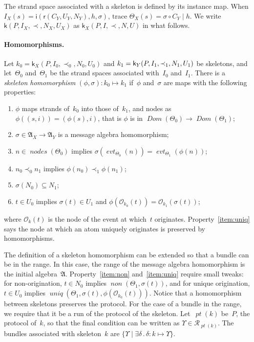 \documentclass[titlepage,12pt]{article}
\newcommand{\fn}[1]{\ensuremath{\operatorname{\mathit{#1}}}}
\newcommand{\typ}{\mathbin:}
\newcommand{\sdom}{\fn{Dom}}
\newcommand{\some}[1]{\exists#1\mathpunct.}
\newcommand{\prefix}[2]{#1\mid#2}
\newcommand{\run}{\mathcal{R}}
\newcommand{\pt}{\fn{pt}}
\newcommand{\alg}[1]{\ensuremath{\mathfrak#1}}
\newcommand{\skel}{\mathsf{k}}
\newcommand{\insta}{\mathsf{i}}
\newcommand{\evt}{\fn{evt}}
\newcommand{\role}{\mathsf{r}}
\newcommand{\orig}{\mathcal{O}}
\begin{document}
The strand space associated with a skeleton is defined by its instance
map.  When $I_X(s)=\insta(\role(C_Y,U_Y,N_Y),h,\sigma)$, trace
$\Theta_X(s)=\sigma\circ\prefix{C_Y}{h}$.  We write
$\skel(P,I_X,\prec,N_X,U_X)$ as $\skel_X(P,I,\prec,N,U)$ in what
follows.

\paragraph{Homomorphisms.}
Let $k_0=\skel_X(P,I_0,\prec_0,N_0,U_0)$ and
$k_1=\skel_Y(P,I_1,\prec_1,\break N_1,U_1)$ be skeletons, and
let~$\Theta_0$ and~$\Theta_1$ be the strand spaces associated
with~$I_0$ and~$I_1$.  There is a \emph{skeleton
  homomorphism} $(\phi,\sigma)\typ k_0\mapsto k_1$ if~$\phi$
and~$\sigma$ are maps with the following properties:
\begin{enumerate}
\item\label{item:strand} $\phi$ maps strands of~$k_0$ into those
  of~$k_1$, and nodes as $\phi((s,i))=(\phi(s),i)$, that is $\phi$ is
  in $\sdom(\Theta_0)\to\sdom(\Theta_1)$;
\item\label{item:msg} $\sigma\in\alg{A}_X\to\alg{A}_Y$ is a message
  algebra homomorphism;
\item\label{item:node} $n\in\fn{nodes}(\Theta_0)$ implies
  $\sigma(\evt_{\Theta_0}(n))=\evt_{\Theta_1}(\phi(n))$;
\item\label{item:order} $n_0\prec_0
n_1$ implies $\phi(n_0)\prec_1\phi(n_1)$;
\item\label{item:non} $\sigma(N_0)\subseteq N_1$;
\item\label{item:uniq} $t\in U_0$ implies $\sigma(t)\in U_1$ and
  $\phi(\orig_{k_0}(t))=\orig_{k_1}(\sigma(t))$;
\end{enumerate}
where $\orig_k(t)$ is the node of the event at which~$t$ originates.
Property~\ref{item:uniq} says the node at which an atom uniquely
originates is preserved by homomorphisms.

The definition of a skeleton homomorphism can be extended so that a
bundle can be in the range.  In this case, the range of the message
algebra homomorphism is the initial algebra~\alg{A}.
Property~\ref{item:non} and~\ref{item:uniq} require small tweaks: for
non-origination, $t\in N_0$ implies $\fn{non}(\Theta_1,\sigma(t))$,
and for unique origination, $t\in U_0$ implies
$\fn{uniq}(\Theta_1,\sigma(t),\phi(\orig_{k_0}(t)))$.  Notice that a
homomorphism between skeletons preserves the protocol.  For the case
of a bundle in the range, we require that it be a run of the protocol
of the skeleton.  Let~$\pt(k)$ be~$P$, the protocol of~$k$, so that
the final condition can be written as $\Upsilon\in\run_{\pt(k)}$.  The
bundles associated with skeleton~$k$ are $\{\Upsilon\mid
\some{\delta}\delta\typ k\mapsto\Upsilon \}$.
\end{document}

